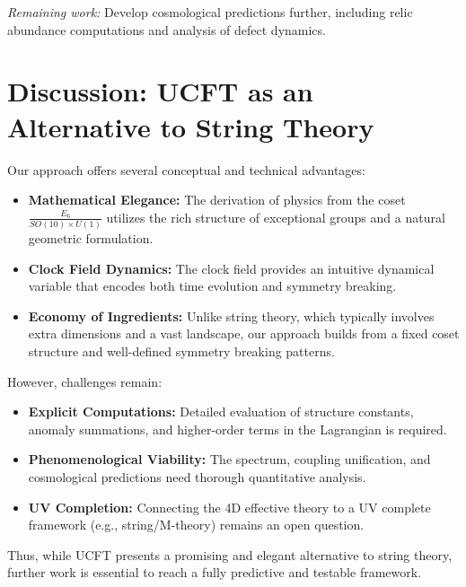 \documentclass[aps,prd,preprint,groupedaddress]{revtex4-2}
\begin{document}
\emph{Remaining work:} Develop cosmological predictions further, including relic abundance computations and analysis of defect dynamics.

\section{Discussion: UCFT as an Alternative to String Theory}
Our approach offers several conceptual and technical advantages:
\begin{itemize}
  \item \textbf{Mathematical Elegance:} The derivation of physics from the coset $\frac{E_6}{SO(10)\times U(1)}$ utilizes the rich structure of exceptional groups and a natural geometric formulation.
  \item \textbf{Clock Field Dynamics:} The clock field provides an intuitive dynamical variable that encodes both time evolution and symmetry breaking.
  \item \textbf{Economy of Ingredients:} Unlike string theory, which typically involves extra dimensions and a vast landscape, our approach builds from a fixed coset structure and well-defined symmetry breaking patterns.
\end{itemize}
However, challenges remain:
\begin{itemize}
  \item \textbf{Explicit Computations:} Detailed evaluation of structure constants, anomaly summations, and higher-order terms in the Lagrangian is required.
  \item \textbf{Phenomenological Viability:} The spectrum, coupling unification, and cosmological predictions need thorough quantitative analysis.
  \item \textbf{UV Completion:} Connecting the 4D effective theory to a UV complete framework (e.g., string/M-theory) remains an open question.
\end{itemize}
Thus, while UCFT presents a promising and elegant alternative to string theory, further work is essential to reach a fully predictive and testable framework.

\end{document}
